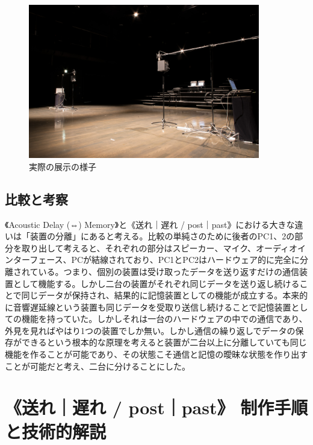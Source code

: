 \documentclass[a4paper,report]{jsbook}
\begin{document}
\begin{figure}[htbp]
\centering
\includegraphics[width=0.90000\textwidth]{./img/postpast1.jpg}
\caption{実際の展示の様子\label{fig:zentai}}
\end{figure}

\section{比較と考察}\label{ux6bd4ux8f03ux3068ux8003ux5bdf}

《Acoustic Delay (⇔) Memory》と《送れ｜遅れ /
post｜past》における大きな違いは「装置の分離」にあると考える。比較の単純さのために後者のPC1、2の部分を取り出して考えると、それぞれの部分はスピーカー、マイク、オーディオインターフェース、PCが結線されており、PC1とPC2はハードウェア的に完全に分離されている。つまり、個別の装置は受け取ったデータを送り返すだけの通信装置として機能する。しかし二台の装置がそれぞれ同じデータを送り返し続けることで同じデータが保持され、結果的に記憶装置としての機能が成立する。本来的に音響遅延線という装置も同じデータを受取り送信し続けることで記憶装置としての機能を持っていた。しかしそれは一台のハードウェアの中での通信であり、外見を見ればやはり1つの装置でしか無い。しかし通信の繰り返しでデータの保存ができるという根本的な原理を考えると装置が二台以上に分離していても同じ機能を作ることが可能であり、その状態こそ通信と記憶の曖昧な状態を作り出すことが可能だと考え、二台に分けることにした。

\chapter{《送れ｜遅れ / post｜past》
制作手順と技術的解説}\label{ux9001ux308cux9045ux308c-postpast-ux5236ux4f5cux624bux9806ux3068ux6280ux8853ux7684ux89e3ux8aac}
\end{document}
